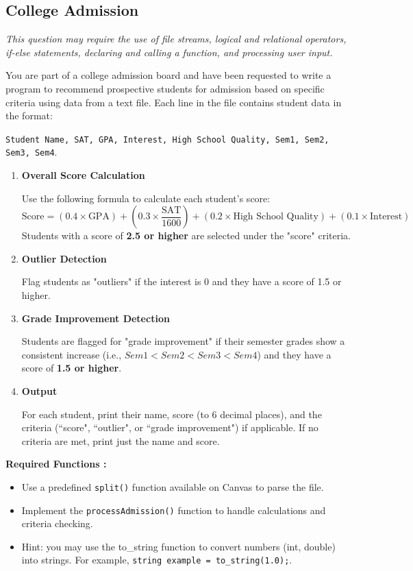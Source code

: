 \subsection{College Admission} 
\textit{This question may require the use of file streams, logical and relational operators, if-else statements, declaring and calling a function, and processing user input.}

You are part of a college admission board and have been requested to write a program to recommend prospective students for admission based on specific criteria using data from a text file. Each line in the file contains student data in the format:

\verb|Student Name, SAT, GPA, Interest, High School Quality, Sem1, Sem2, Sem3, Sem4|.

\begin{enumerate}
    \item \textbf{Overall Score Calculation}

Use the following formula to calculate each student’s score:
\[
\text{Score} = (0.4 \times \text{GPA}) + (0.3 \times \frac{\text{SAT}}{1600}) + (0.2 \times \text{High School Quality}) + (0.1 \times \text{Interest})
\]
Students with a score of \textbf{2.5 or higher} are selected under the "score" criteria.

    \item \textbf{Outlier Detection}

Flag students as "outliers" if the interest is 0 and they have a score of 1.5 or higher.

    \item \textbf{Grade Improvement Detection}

Students are flagged for "grade improvement" if their semester grades show a consistent increase (i.e., \(Sem1 < Sem2 < Sem3 < Sem4\)) and they have a score of \textbf{1.5 or higher}.

    \item \textbf{Output}

For each student, print their name, score (to 6 decimal places), and the criteria (``score", ``outlier", or ``grade improvement") if applicable. If no criteria are met, print just the name and score.
\end{enumerate}

\textbf{Required Functions :}

\begin{itemize}
    \item Use a predefined \verb|split()| function available on Canvas to parse the file.
    \item Implement the \verb|processAdmission()| function to handle calculations and criteria checking.
    \item Hint: you may use the to\_string function to convert numbers (int, double) into strings. For example, \texttt{string example = to_string(1.0);}. 
\end{itemize}
 
